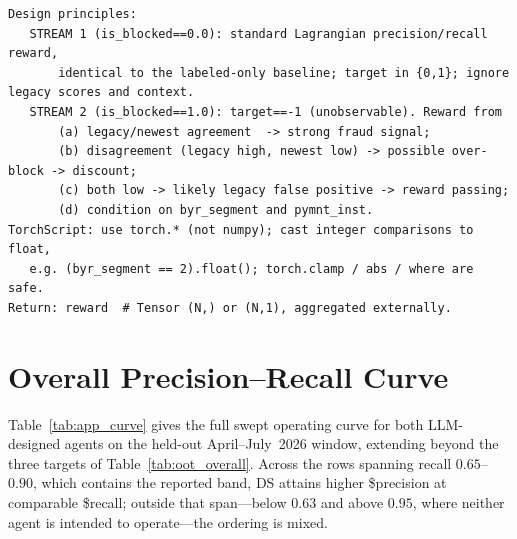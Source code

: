 \documentclass[11pt]{article}
\begin{document}
\begin{lstlisting}[basicstyle=\ttfamily\scriptsize,breaklines=true,numbers=none,frame=single,captionpos=b,caption={Condensed 19-argument reward-signature reference (anonymized, ASCII).},label={lst:prompt_sig}]
Design principles:
   STREAM 1 (is_blocked==0.0): standard Lagrangian precision/recall reward,
       identical to the labeled-only baseline; target in {0,1}; ignore legacy scores and context.
   STREAM 2 (is_blocked==1.0): target==-1 (unobservable). Reward from
       (a) legacy/newest agreement  -> strong fraud signal;
       (b) disagreement (legacy high, newest low) -> possible over-block -> discount;
       (c) both low -> likely legacy false positive -> reward passing;
       (d) condition on byr_segment and pymnt_inst.
TorchScript: use torch.* (not numpy); cast integer comparisons to float,
   e.g. (byr_segment == 2).float(); torch.clamp / abs / where are safe.
Return: reward  # Tensor (N,) or (N,1), aggregated externally.
\end{lstlisting}

\section{Overall Precision--Recall Curve}
\label{appendix:oot}
Table~\ref{tab:app_curve} gives the full swept operating curve for both LLM-designed agents on the
held-out April--July~2026 window, extending beyond the three targets of
Table~\ref{tab:oot_overall}. Across the rows spanning recall $0.65$--$0.90$, which contains the
reported band, DS attains higher \$precision at comparable \$recall; outside that span---below
$0.63$ and above $0.95$, where neither agent is intended to operate---the ordering is mixed.
\end{document}
